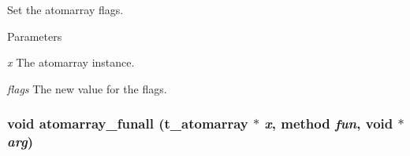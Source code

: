 Set the atomarray flags. 
\begin{DoxyParams}{Parameters}
\item[{\em x}]The atomarray instance. \item[{\em flags}]The new value for the flags. \end{DoxyParams}
\hypertarget{group__atomarray_gacfb767a18f14fb13a0952c6ed7903de1}{
\subsubsection[{atomarray\_\-funall}]{\setlength{\rightskip}{0pt plus 5cm}void atomarray\_\-funall ({\bf t\_\-atomarray} $\ast$ {\em x}, \/  {\bf method} {\em fun}, \/  void $\ast$ {\em arg})}}
\label{group__atomarray_gacfb767a18f14fb13a0952c6ed7903de1}


